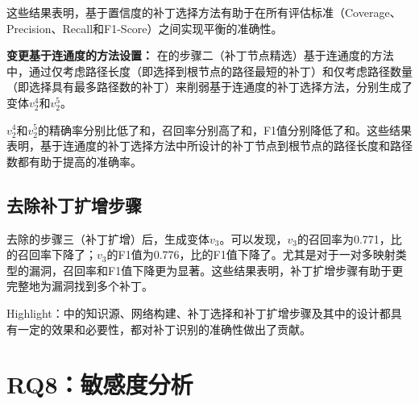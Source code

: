 这些结果表明，基于置信度的补丁选择方法有助于在所有评估标准（Coverage、Precision、Recall和F1-Score）之间实现平衡的准确性。

\textbf{变更基于连通度的方法设置：}
在\tool 的步骤二（补丁节点精选）基于连通度的方法中，通过仅考虑路径长度（即选择到根节点的路径最短的补丁）和仅考虑路径数量（即选择具有最多路径数的补丁）来削弱基于连通度的补丁选择方法，分别生成了变体$v_2^4$和$v_2^5$。

$v_2^4$和$v_2^5$的精确率分别比\tool 低了和，召回率分别高了和，F1值分别降低了和。这些结果表明，基于连通度的补丁选择方法中所设计的补丁节点到根节点的路径长度和路径数都有助于提高\tool 的准确率。

\subsection{去除补丁扩增步骤}
去除\tool 的步骤三（补丁扩增）后，生成变体$v_3$。可以发现，$v_3$的召回率为0.771，比\tool 的召回率下降了；$v_3$的F1值为0.776，比\tool 的F1值下降了。尤其是对于一对多映射类型的漏洞，召回率和F1值下降更为显著。这些结果表明，补丁扩增步骤有助于\tool 更完整地为漏洞找到多个补丁。

\begin{tcolorbox}[size=title,opacityfill=0.15]
Highlight：\tool 中的知识源、网络构建、补丁选择和补丁扩增步骤及其中的设计都具有一定的效果和必要性，都对\tool  补丁识别的准确性做出了贡献。
\end{tcolorbox}

\section{RQ8：敏感度分析}\label{sec:sensitivity}

